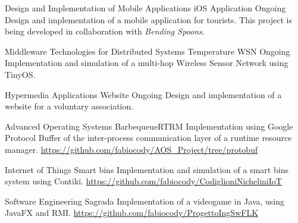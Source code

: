 \begin{cventries}
    
\cventry
    {Design and Implementation of Mobile Applications}
    {iOS Application}
    {Ongoing}
    {}
    {Design and implementation of a mobile application for tourists. This project is being developed in collaboration with \textit{Bending Spoons}.}
    
\cventry
    {Middleware Technologies for Distributed Systems}
    {Temperature WSN}
    {Ongoing}
    {}
    {Implementation and simulation of a multi-hop Wireless Sensor Network using TinyOS.}
    
\cventry
    {Hypermedia Applications}
    {Website}
    {Ongoing}
    {}
    {Design and implementation of a website for a voluntary association.}

\iffalse
\cventry
    {Recommender System}
    {Kaggle competition}
    {}
    {}
    {Design and implementation of a system able to recommend relevant items to users of an e-commerce website. \href{https://github.com/Alenichel/CodiglioniNichelini\_recsys-polimi-2019}{https://github.com/Alenichel/CodiglioniNichelini\_recsys-polimi-2019}}
\fi
    
\cventry
    {Advanced Operating Systems}
    {BarbequeueRTRM}
    {}
    {}
    {Implementation using Google Protocol Buffer of the inter-process communication layer of a runtime resource manager. \href{https://github.com/fabiocody/AOS\_Project/tree/protobuf}{https://github.com/fabiocody/AOS\_Project/tree/protobuf}}
    
\cventry
    {Internet of Things}
    {Smart bins}
    {}
    {}
    {Implementation and simulation of a smart bins system using Contiki. \qquad\qquad\qquad\qquad\qquad\qquad\href{https://github.com/fabiocody/CodiglioniNicheliniIoT}{https://github.com/fabiocody/CodiglioniNicheliniIoT}}
    
\cventry
    {Software Engineering}
    {Sagrada}
    {}
    {}
    {Implementation of a videogame in Java, using JavaFX and RMI. \qquad\qquad\qquad\qquad\qquad\qquad\qquad\href{https://github.com/fabiocody/ProgettoIngSwFLK}{https://github.com/fabiocody/ProgettoIngSwFLK}}
    
    
\end{cventries}


